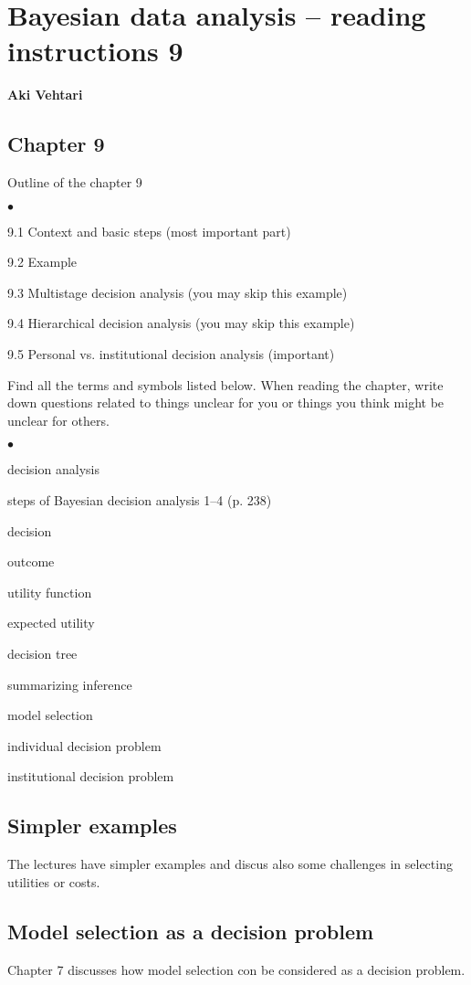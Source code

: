 \documentclass[a4paper,11pt,english]{article}
\begin{document}
\thispagestyle{empty}

\section*{Bayesian data analysis -- reading instructions 9} 
\smallskip
{\bf Aki Vehtari}
\smallskip

\subsection*{Chapter 9}

Outline of the chapter 9
\begin{list}{$\bullet$}{\parsep=0pt\itemsep=2pt}
\item 9.1 Context and basic steps (most important part)
\item 9.2 Example
\item 9.3 Multistage decision analysis (you may skip this example)
\item 9.4 Hierarchical decision analysis (you may skip this example)
\item 9.5 Personal vs. institutional decision analysis (important)
\end{list}

Find all the terms and symbols listed below. When reading the chapter,
write down questions related to things unclear for you or things you
think might be unclear for others. 
\begin{list}{$\bullet$}{\parsep=0pt\itemsep=2pt}
\item decision analysis
\item steps of Bayesian decision analysis 1--4 (p. 238)
\item decision
\item outcome
\item utility function
\item expected utility
\item decision tree
\item summarizing inference
\item model selection
\item individual decision problem
\item institutional decision problem
\end{list}

\subsection*{Simpler examples}

The lectures have simpler examples and discus also some challenges in
selecting utilities or costs.

\subsection*{Model selection as a decision problem}

Chapter 7 discusses how model selection con be considered as a
decision problem.
\end{document}
